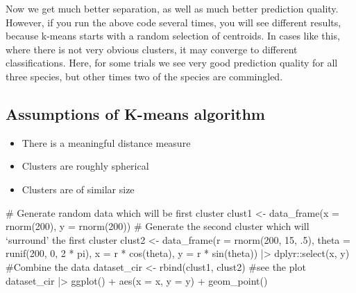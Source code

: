 \documentclass[
  letterpaper,
  DIV=11,
  numbers=noendperiod]{scrreprt}
\newenvironment{Shaded}{\begin{snugshade}}{\end{snugshade}}
\newcommand{\NormalTok}[1]{\textcolor[rgb]{0.00,0.23,0.31}{#1}}
\providecommand{\tightlist}{%
  \setlength{\itemsep}{0pt}\setlength{\parskip}{0pt}}\usepackage{longtable,booktabs,array}
\begin{document}
Now we get much better separation, as well as much better prediction
quality. However, if you run the above code several times, you will see
different results, because k-means starts with a random selection of
centroids. In cases like this, where there is not very obvious clusters,
it may converge to different classifications. Here, for some trials we
see very good prediction quality for all three species, but other times
two of the species are commingled.

\subsection{Assumptions of K-means
algorithm}\label{assumptions-of-k-means-algorithm}

\begin{itemize}
\tightlist
\item
  There is a meaningful distance measure
\item
  Clusters are roughly spherical
\item
  Clusters are of similar size
\end{itemize}

\begin{Shaded}
\begin{Highlighting}[]
\NormalTok{\# Generate random data which will be first cluster}
\NormalTok{clust1 \textless{}{-} data\_frame(x = rnorm(200), y = rnorm(200))}
\NormalTok{\# Generate the second cluster which will ‘surround’ the first cluster}
\NormalTok{clust2 \textless{}{-} data\_frame(r = rnorm(200, 15, .5), }
\NormalTok{                     theta = runif(200, 0, 2 * pi),}
\NormalTok{                 x = r * cos(theta), y = r * sin(theta)) |\textgreater{}}
\NormalTok{  dplyr::select(x, y)}
\NormalTok{\#Combine the data}
\NormalTok{dataset\_cir \textless{}{-} rbind(clust1, clust2)}
\NormalTok{\#see the plot}
\NormalTok{dataset\_cir |\textgreater{} ggplot() + aes(x = x, y = y) + geom\_point()}
\end{Highlighting}
\end{Shaded}

\begin{Shaded}
\end{Shaded}
\end{document}

